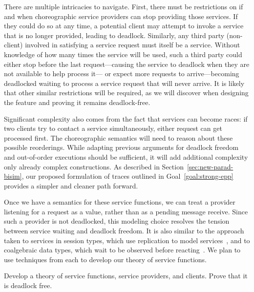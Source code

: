 There are multiple intricacies to navigate.
First, there must be restrictions on if and when choreographic service providers can stop providing those services.
If they could do so at any time, a potential client may attempt to invoke a service that is no longer provided, leading to deadlock.
Similarly, any third party (non-client) involved in satisfying a service request must itself be a service.
Without knowledge of how many times the service will be used,
such a third party could either stop before the last request---causing the service to deadlock when they are not available to help process it---%
or expect more requests to arrive---becoming deadlocked waiting to process a service request that will never arrive.
It is likely that other similar restrictions will be required, as we will discover when designing the feature and proving it remains deadlock-free.

Significant complexity also comes from the fact that services can become races:
if two clients try to contact a service simultaneously, either request can get processed first.
The choreographic semantics will need to reason about these possible reorderings.
While adapting previous arguments for deadlock freedom and out-of-order executions should be sufficient,
it will add additional complexity only already complex constructions.
As described in Section~\ref{sec:new-parad-bisim}, our proposed formulation of traces outlined in Goal~\ref{goal:strong-epp}
provides a simpler and cleaner path forward.

Once we have a semantics for these service functions, we can treat a provider listening for a request as a value, rather than as a pending message receive.
Since such a provider is not deadlocked, this modeling choice resolves the tension between service waiting and deadlock freedom.
It is also similar to the approach taken to services in session types, which use replication to model services~\cite{DeYoungCPT09,CairesP10,Wadler12,LeBrunFD25},
and to coalgebraic data types, which wait to be observed before reacting~\cite{KozenS17}.
We plan to use techniques from each to develop our theory of service functions.

\begin{goal}
  \label{goal:wait-until-called}
  Develop a theory of service functions, service providers, and clients.
  Prove that it is deadlock free.
\end{goal}


\iffalse
{}

